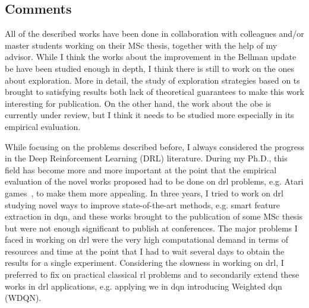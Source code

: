 \subsection{Comments}
All of the described works have been done in collaboration with colleagues and/or master students working on their MSc thesis, together with the help of my advisor. While I think the works about the improvement in the Bellman update \gls{be} have been studied enough in depth, I think there is still to work on the ones about exploration. More in detail, the study of exploration strategies based on \gls{ts} brought to satisfying results both lack of theoretical guarantees to make this work interesting for publication. On the other hand, the work about the \gls{obe} is currently under review, but I think it needs to be studied more especially in its empirical evaluation.

While focusing on the problems described before, I always considered the progress in the Deep Reinforcement Learning (DRL) literature. During my Ph.D., this field has become more and more important at the point that the empirical evaluation of the novel works proposed had to be done on \gls{drl} problems, e.g. Atari games~\cite{bellemare13arcade}, to make them more appealing. In three years, I tried to work on \gls{drl} studying novel ways to improve state-of-the-art methods, e.g. smart feature extraction in \gls{dqn}, and these works brought to the publication of some MSc thesis but were not enough significant to publish at conferences. The major problems I faced in working on \gls{drl} were the very high computational demand in terms of resources and time at the point that I had to wait several days to obtain the results for a single experiment. Considering the slowness in working on \gls{drl}, I preferred to fix on practical classical \gls{rl} problems and to secondarily extend these works in \gls{drl} applications, e.g. applying \gls{we} in \gls{dqn} introducing Weighted \gls{dqn} (WDQN).

